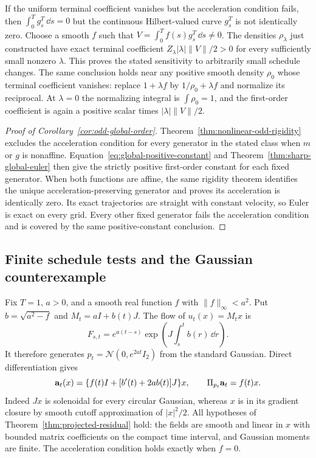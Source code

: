 If the uniform terminal coefficient vanishes but the acceleration
condition fails, then $\int_0^Tg_s^T\,\dd s=0$ but the continuous
Hilbert-valued curve $g_s^T$ is not identically zero.  Choose a smooth
$f$ such that $V=\int_0^Tf(s)g_s^T\,\dd s\ne0$.  The densities
$\rho_\lambda$ just constructed have exact terminal coefficient
$Z_\lambda|\lambda|\|V\|/2>0$ for every sufficiently small nonzero
$\lambda$.  This proves the stated sensitivity to arbitrarily small
schedule changes.
The same conclusion holds near any positive smooth density $\rho_0$
whose terminal coefficient vanishes: replace $1+\lambda f$ by
$1/\rho_0+\lambda f$ and normalize its reciprocal.  At $\lambda=0$
the normalizing integral is $\int\rho_0=1$, and the first-order
coefficient is again a positive scalar times $|\lambda|\|V\|/2$.

\begin{proof}[Proof of Corollary~\ref{cor:odd-global-order}]
Theorem~\ref{thm:nonlinear-odd-rigidity} excludes the acceleration
condition for every generator in the stated class when $m$ or $g$ is
nonaffine.  Equation~\eqref{eq:global-positive-constant} and
Theorem~\ref{thm:sharp-global-euler} then give the strictly positive
first-order constant for each fixed generator.  When both functions
are affine, the same rigidity theorem identifies the unique
acceleration-preserving generator and proves its acceleration is
identically zero.  Its exact trajectories are straight with constant
velocity, so Euler is exact on every grid.  Every other fixed
generator fails the acceleration condition and is covered by the
same positive-constant conclusion.
\end{proof}

\subsection{Finite schedule tests and the Gaussian counterexample}

Fix $T=1$, $a>0$, and a smooth real function $f$ with
$\|f\|_\infty<a^2$.  Put $b=\sqrt{a^2-f}$ and
$M_t=aI+b(t)J$.  The flow of $u_t(x)=M_tx$ is
\[
 F_{s,t}=e^{a(t-s)}
       \exp\left(J\int_s^tb(r)\,\dd r\right).
\]
It therefore generates $p_t=\mathcal N(0,e^{2at}I_2)$ from the
standard Gaussian.  Direct differentiation gives
\begin{equation}
 \mathbf a_t(x)=\{f(t)I+[b'(t)+2ab(t)]J\}x,
 \qquad \Pi_{p_t}\mathbf a_t=f(t)x.
 \label{eq:cosine-acceleration-projection}
\end{equation}
Indeed $Jx$ is solenoidal for every circular Gaussian, whereas $x$
is in its gradient closure by smooth cutoff approximation of
$|x|^2/2$.  All hypotheses of Theorem~\ref{thm:projected-residual}
hold: the fields are smooth and linear in $x$ with bounded matrix
coefficients on the compact time interval, and Gaussian moments are
finite.  The acceleration condition holds exactly when $f=0$.

